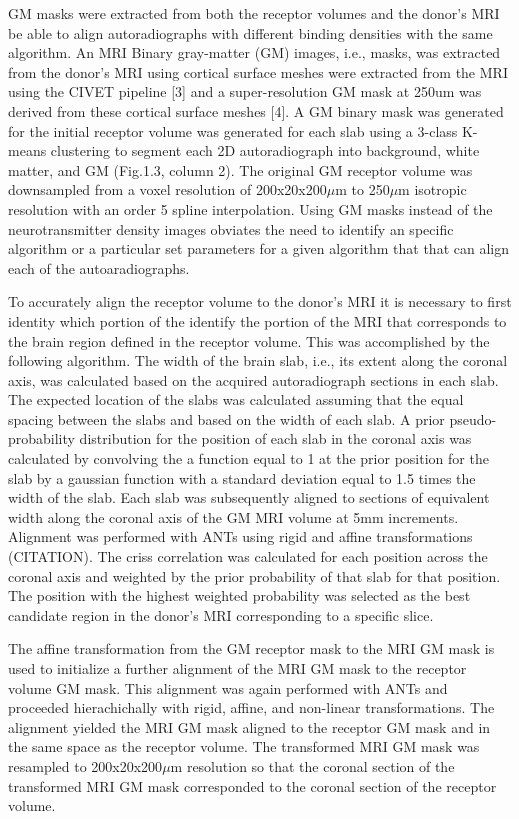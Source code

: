 \documentclass[12pt]{article}
\begin{document}
    GM masks were extracted from both the receptor volumes and the donor's MRI be able to align autoradiographs with different binding densities with the same algorithm. An MRI Binary gray-matter (GM) images, i.e., masks, was extracted from the donor's MRI using cortical surface meshes were extracted from the MRI using the CIVET pipeline [3] and a super-resolution GM mask at 250um was derived from these cortical surface meshes [4]. A GM binary mask was generated for the initial receptor volume was generated for each slab using a 3-class K-means clustering to segment each 2D autoradiograph into background, white matter, and GM (Fig.1.3, column 2). The original GM receptor volume was downsampled from a voxel resolution of 200x20x200$\mu$m to 250$\mu$m isotropic resolution with an order 5 spline interpolation. Using GM masks instead of the neurotransmitter density images obviates the need to identify an specific algorithm or a particular set parameters for a given algorithm that that can align each of the autoaradiographs. 
    
    To accurately align the receptor volume to the donor's MRI it is necessary to first identity which portion of the identify the portion of the MRI that corresponds to the brain region defined in the receptor volume. This was accomplished by the following algorithm. The width of the brain slab, i.e., its extent along the coronal axis, was calculated based on the acquired autoradiograph sections in each slab. The expected location of the slabs was calculated assuming that the equal spacing between the slabs and based on the width of each slab. A prior pseudo-probability distribution for the position of each slab in the coronal axis was calculated by convolving the a function equal to 1 at the prior position for the slab by a gaussian function with a standard deviation equal to  1.5 times the width of the slab. Each slab was subsequently aligned to sections of equivalent width along the coronal axis of the GM MRI volume at 5mm increments. Alignment was performed with ANTs using rigid and affine transformations (CITATION). The criss correlation was calculated for each position across the coronal axis and weighted by the prior probability of that slab for that position. The position with the highest weighted probability was selected as the best candidate region in the donor's MRI corresponding to a specific slice. 
    
    The affine transformation from the GM receptor mask to the MRI GM mask is used to initialize a further alignment of the MRI GM mask to the receptor volume GM mask. This alignment was again performed with ANTs and proceeded hierachichally with rigid, affine, and non-linear transformations. The alignment yielded the MRI GM mask aligned to the receptor GM mask and in the same space as the receptor volume. The transformed MRI GM mask was resampled to 200x20x200$\mu$m resolution so that the coronal section of the transformed MRI GM mask corresponded to the coronal section of the receptor volume. 
    
\end{document}
